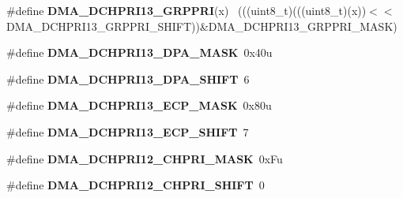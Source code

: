\begin{DoxyCompactItemize}
\item 
\hypertarget{group___d_m_a___register___masks_ga3cef2cfdaeec2120f293afd7fed2d8b3}{}\#define {\bfseries D\+M\+A\+\_\+\+D\+C\+H\+P\+R\+I13\+\_\+\+G\+R\+P\+P\+R\+I}(x)                                  ~(((uint8\+\_\+t)(((uint8\+\_\+t)(x))$<$$<$D\+M\+A\+\_\+\+D\+C\+H\+P\+R\+I13\+\_\+\+G\+R\+P\+P\+R\+I\+\_\+\+S\+H\+I\+F\+T))\&D\+M\+A\+\_\+\+D\+C\+H\+P\+R\+I13\+\_\+\+G\+R\+P\+P\+R\+I\+\_\+\+M\+A\+S\+K)\label{group___d_m_a___register___masks_ga3cef2cfdaeec2120f293afd7fed2d8b3}

\item 
\hypertarget{group___d_m_a___register___masks_ga7d0dba9a621669e28a8c6c557d962502}{}\#define {\bfseries D\+M\+A\+\_\+\+D\+C\+H\+P\+R\+I13\+\_\+\+D\+P\+A\+\_\+\+M\+A\+S\+K}~0x40u\label{group___d_m_a___register___masks_ga7d0dba9a621669e28a8c6c557d962502}

\item 
\hypertarget{group___d_m_a___register___masks_ga94fae69ff7774aa7d1f24fd8b2387a40}{}\#define {\bfseries D\+M\+A\+\_\+\+D\+C\+H\+P\+R\+I13\+\_\+\+D\+P\+A\+\_\+\+S\+H\+I\+F\+T}~6\label{group___d_m_a___register___masks_ga94fae69ff7774aa7d1f24fd8b2387a40}

\item 
\hypertarget{group___d_m_a___register___masks_ga74ad97c0ca8dfdd5152b2db375389908}{}\#define {\bfseries D\+M\+A\+\_\+\+D\+C\+H\+P\+R\+I13\+\_\+\+E\+C\+P\+\_\+\+M\+A\+S\+K}~0x80u\label{group___d_m_a___register___masks_ga74ad97c0ca8dfdd5152b2db375389908}

\item 
\hypertarget{group___d_m_a___register___masks_ga462e7c666fbe9d355893654f7fe52cd9}{}\#define {\bfseries D\+M\+A\+\_\+\+D\+C\+H\+P\+R\+I13\+\_\+\+E\+C\+P\+\_\+\+S\+H\+I\+F\+T}~7\label{group___d_m_a___register___masks_ga462e7c666fbe9d355893654f7fe52cd9}

\item 
\hypertarget{group___d_m_a___register___masks_gae4a41c199e83720c8912622f921f3993}{}\#define {\bfseries D\+M\+A\+\_\+\+D\+C\+H\+P\+R\+I12\+\_\+\+C\+H\+P\+R\+I\+\_\+\+M\+A\+S\+K}~0x\+Fu\label{group___d_m_a___register___masks_gae4a41c199e83720c8912622f921f3993}

\item 
\hypertarget{group___d_m_a___register___masks_ga463e67297f7a0d3b1c7c6799ac90fb15}{}\#define {\bfseries D\+M\+A\+\_\+\+D\+C\+H\+P\+R\+I12\+\_\+\+C\+H\+P\+R\+I\+\_\+\+S\+H\+I\+F\+T}~0\label{group___d_m_a___register___masks_ga463e67297f7a0d3b1c7c6799ac90fb15}


\end{DoxyCompactItemize}
